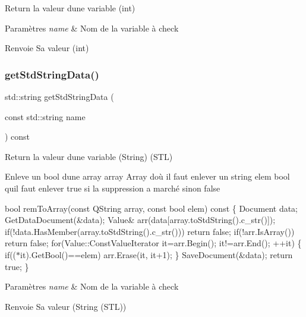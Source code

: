 Return la valeur d\textquotesingle{}une variable (int) 


\begin{DoxyParams}{Paramètres}
{\em name} & Nom de la variable à check \\
\hline
\end{DoxyParams}
\begin{DoxyReturn}{Renvoie}
Sa valeur (int) 
\end{DoxyReturn}
\mbox{\label{classDataManager_a22680422b7ea8ff8fd9c7a24a47193c3}} 
\subsubsection{\texorpdfstring{get\+Std\+String\+Data()}{getStdStringData()}}
{\footnotesize\ttfamily std\+::string get\+Std\+String\+Data (\begin{DoxyParamCaption}\item[{const std\+::string}]{name }\end{DoxyParamCaption}) const\hspace{0.3cm}{\ttfamily [inline]}}



Return la valeur d\textquotesingle{}une variable (String) (S\+TL) 

Enleve un bool d\textquotesingle{}une array  array Array d\textquotesingle{}où il faut enlever un string  elem bool qu\textquotesingle{}il faut enlever  true si la suppression a marché sinon false

bool rem\+To\+Array(const Q\+String array, const bool elem) const \{ Document data; Get\+Data\+Document(\&data); Value\& arr(data\mbox{[}array.\+to\+Std\+String().c\+\_\+str()\mbox{]}); if(!data.Has\+Member(array.\+to\+Std\+String().c\+\_\+str())) return false; if(!arr.Is\+Array()) return false; for(Value\+::\+Const\+Value\+Iterator it=arr.\+Begin(); it!=arr.\+End(); ++it) \{ if(($\ast$it).Get\+Bool()==elem) arr.\+Erase(it, it+1); \} Save\+Document(\&data); return true; \}


\begin{DoxyParams}{Paramètres}
{\em name} & Nom de la variable à check \\
\hline
\end{DoxyParams}
\begin{DoxyReturn}{Renvoie}
Sa valeur (String (S\+TL)) 
\end{DoxyReturn}
\mbox{\label{classDataManager_adcb9caff55a85e95a70b07a157ff10ce}} 
